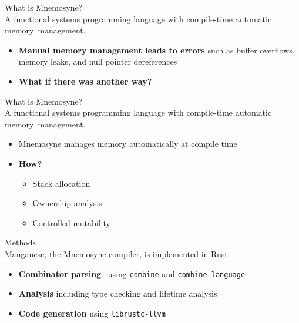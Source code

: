 \documentclass{beamer}
\begin{document}
\begin{frame}
\alert{\huge{What is Mnemosyne?}}\\
\large{A functional systems programming language with \alert<1->{compile-time automatic memory~management}.}\normalsize
\begin{itemize}
    \item \textbf{Manual memory management leads to errors} such as buffer overflows, memory leaks, and null pointer dereferences~\cite{Shapiro:2006:PLC:1215995.1216004,hawblitzel2004low}
    \item \textbf{What if there was another way?}
\end{itemize}
\end{frame}

\begin{frame}
\alert{\huge{What is Mnemosyne?}}\\
\large{A functional systems programming language with \alert<1->{compile-time automatic memory~management}.}\normalsize
\begin{itemize}
    \item Mnemosyne manages memory automatically at compile time
    \item \textbf{How?}
    \begin{itemize}
    \item<2-> Stack allocation~\cite{Hanson:1990:ESA:91556.91603,Corry:2006:OSA:1133956.1133978,Matsakis:2014:RL:2663171.2663188}
    \item<2-> Ownership analysis~\cite{Matsakis:2014:RL:2663171.2663188}
    \item<2-> Controlled mutability~\cite{Matsakis:2014:RL:2663171.2663188}
\end{itemize}
\end{itemize}
\end{frame}

\begin{frame}
\alert{\huge{Methods}}\\
\large{Manganese, the Mnemosyne compiler, is implemented in Rust}\normalsize
\begin{itemize}
    \item \textbf{Combinator parsing}~\cite{Danielsson:2010:TPC:1932681.1863585,frost2008parser,swierstra2001combinator,hutton1996monadic} using \texttt{combine} and \texttt{combine-language}
    \item \textbf{Analysis} including type checking and lifetime analysis~\cite{Matsakis:2014:RL:2663171.2663188,balvarro1988lifetime}
    \item \textbf{Code generation} using \texttt{librustc-llvm}~\cite{Lattner:2004:LCF:977395.977673}
\end{itemize}
\end{frame}
\end{document}
